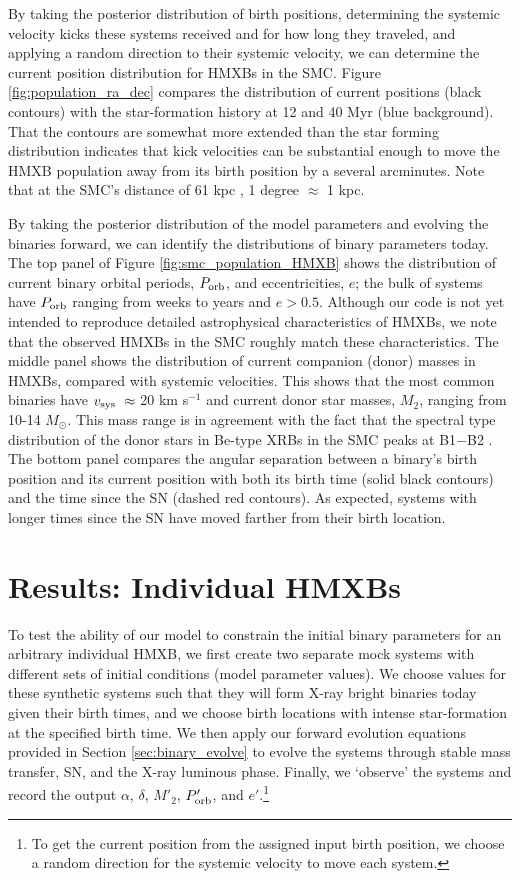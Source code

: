 \documentclass[usenatbib]{mnras}
\newcommand{\Msun}{\ifmmode {M_{\odot}}\else${M_{\odot}}$\fi}
\begin{document}
By taking the posterior distribution of birth positions, determining the systemic velocity kicks these systems received and for how long they traveled, and applying a random direction to their systemic velocity, we can determine the current position distribution for HMXBs in the SMC. Figure \ref{fig:population_ra_dec} compares the distribution of current positions (black contours) with the star-formation history at 12 and 40 Myr (blue background). That the contours are somewhat more extended than the star forming distribution indicates that kick velocities can be substantial enough to move the HMXB population away from its birth position by a several arcminutes. Note that at the SMC's distance of 61 kpc \citep{hilditch05}, 1 degree $\approx$ 1 kpc.


By taking the posterior distribution of the model parameters and evolving the binaries forward, we can identify the distributions of binary parameters today. The top panel of Figure \ref{fig:smc_population_HMXB} shows the distribution of current binary orbital periods, $P_{\rm orb}$, and eccentricities, $e$; the bulk of systems have $P_{\rm orb}$ ranging from weeks to years and $e>0.5$. Although our code is not yet intended to reproduce detailed astrophysical characteristics of HMXBs, we note that the observed HMXBs in the SMC roughly match these characteristics. The middle panel shows the distribution of current companion (donor) masses in HMXBs, compared with systemic velocities. This shows that the most common binaries have $v_{\rm sys}\ \approx$ 20 km s$^{-1}$ and current donor star masses, $M_2$, ranging from 10-14 \Msun. This mass range is in agreement with the fact that the spectral type distribution of the donor stars in Be-type XRBs in the SMC peaks at B1$-$B2 \citep{mcbride08,maravelias14}. The bottom panel compares the angular separation between a binary's birth position and its current position with both its birth time (solid black contours) and the time since the SN (dashed red contours). As expected, systems with longer times since the SN have moved farther from their birth location. 




\section{Results: Individual HMXBs} \label{sec:results_individual}


To test the ability of our model to constrain the initial binary parameters for an arbitrary individual HMXB, we first create two separate mock systems with different sets of initial conditions (model parameter values). We choose values for these synthetic systems such that they will form X-ray bright binaries today given their birth times, and we choose birth locations with intense star-formation at the specified birth time. We then apply our forward evolution equations provided in Section \ref{sec:binary_evolve} to evolve the systems through stable mass transfer, SN, and the X-ray luminous phase. Finally, we `observe' the systems and record the output $\alpha$, $\delta$, $M'_2$, $P'_{\rm orb}$, and $e'$.\footnote{To get the current position from the assigned input birth position, we choose a random direction for the systemic velocity to move each system.} 
\end{document}
